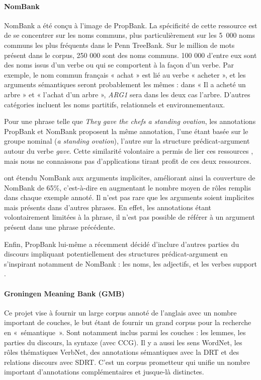 \paragraph{NomBank}

NomBank \citep{meyers2004nombank} a été conçu à l'image de PropBank. La
spécificité de cette ressource est de se concentrer sur les noms communs, plus
particulièrement sur les 5~000 noms communs les plus fréquents dans le Penn
TreeBank. Sur le million de mots présent dans le corpus, 250 000 sont des noms
communs. 100 000 d'entre eux sont des noms issus d'un verbe ou qui se
comportent à la façon d'un verbe. Par exemple, le nom commun français « achat »
est lié au verbe « acheter », et les arguments sémantiques seront probablement
les mêmes : dans « Il a acheté un arbre » et « l'achat d'un arbre »,
\textit{ARG1} sera dans les deux cas l'arbre. D'autres catégories incluent les
noms partitifs, relationnels et environnementaux.

Pour une phrase telle que \textit{They gave the chefs a standing ovation}, les
annotations PropBank et NomBank proposent la même annotation, l'une étant basée
sur le groupe nominal (\textit{a standing ovation}), l'autre sur la structure
prédicat-argument autour du verbe \textit{gave}. Cette similarité volontaire a
permis de lier ces ressources
\citep{pustejovsky2005merging,verhagen2007combining}, mais nous ne connaissons
pas d'applications tirant profit de ces deux ressources.

\cite{gerber2010beyond} ont étendu NomBank aux arguments implicites, améliorant
ainsi la couverture de NomBank de 65\%, c'est-à-dire en augmentant le nombre
moyen de rôles remplis dans chaque exemple annoté. Il n'est pas rare que les
arguments soient implicites mais présents dans d'autres phrases. En effet, les
annotations étant volontairement limitées à la phrase, il n'est pas possible de
référer à un argument présent dans une phrase précédente.

Enfin, PropBank lui-même a récemment décidé d'inclure d'autres parties du
discours impliquant potentiellement des structures prédicat-argument en
s'inspirant notamment de NomBank : les noms, les adjectifs, et les verbes
support \citep{bonial2014propbank}.


\paragraph{Groningen Meaning Bank (GMB)}

Ce projet \citep{basile2014developing} vise à fournir un large corpus annoté de
l'anglais avec un nombre important de couches, le but étant de fournir un grand
corpus pour la recherche en «~sémantique~». Sont notamment inclus parmi les
couches : les lemmes, les parties du discours, la syntaxe (avec CCG). Il y a
aussi les sens WordNet, les rôles thématiques VerbNet, des annotations
sémantiques avec la DRT et des relations discours avec SDRT. C'est un corpus
prometteur qui unifie un nombre important d'annotations complémentaires et
jusque-là distinctes.

